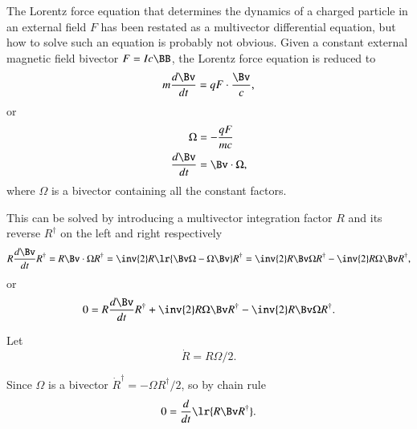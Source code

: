 %
%

The Lorentz force equation that determines the dynamics of a charged particle in an external field \( F \) has been restated as a multivector differential equation, but how to solve such an equation is probably not obvious.
Given a constant external magnetic field bivector \( F = I c \BB \), the Lorentz force equation is reduced to
\begin{dmath}\label{eqn:lorentzForce_constantMagnetic:60}
m \frac{d\Bv}{dt} = q F \cdot \frac{\Bv}{c},
\end{dmath}
or
\begin{dmath}\label{eqn:lorentzForce_constantMagnetic:80}
\begin{aligned}
\Omega &= -\frac{q F}{m c} \\
\frac{d\Bv}{dt} &= \Bv \cdot \Omega,
\end{aligned}
\end{dmath}
where \( \Omega \) is a bivector containing all the constant factors.

This can be solved by introducing a multivector integration factor \( R \) and its reverse \( R^\dagger \) on the left and right respectively
\begin{dmath}\label{eqn:lorentzForce_constantMagnetic:100}
R \frac{d\Bv}{dt} R^\dagger
= R \Bv \cdot \Omega R^\dagger
= \inv{2} R \lr{ \Bv \Omega - \Omega \Bv} R^\dagger
= \inv{2} R \Bv \Omega R^\dagger - \inv{2} R \Omega \Bv R^\dagger,
\end{dmath}
or
\begin{dmath}\label{eqn:lorentzForce_constantMagnetic:120}
0 =
R \frac{d\Bv}{dt} R^\dagger
+ \inv{2} R \Omega \Bv R^\dagger
- \inv{2} R \Bv \Omega R^\dagger.
\end{dmath}

Let
\begin{dmath}\label{eqn:lorentzForce_constantMagnetic:140}
\dot{R} = R \Omega/2.
\end{dmath}

Since \( \Omega \) is a bivector \( \dot{R}^\dagger = -\Omega R^\dagger/2 \), so by chain rule
\begin{dmath}\label{eqn:lorentzForce_constantMagnetic:160}
0
=
\frac{d}{dt} \lr{
R \Bv R^\dagger
}.
\end{dmath}

